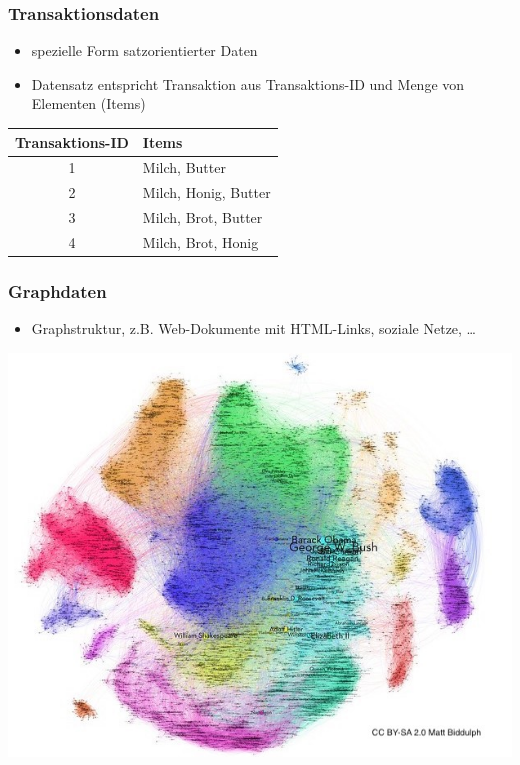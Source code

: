 \begin{frame}
\frametitle{Transaktionsdaten}

\begin{itemize}
\item spezielle Form satzorientierter Daten
\item Datensatz entspricht Transaktion aus Transaktions-ID und Menge von Elementen (Items)
\end{itemize}

\begin{center}
\begin{tabular}{|c|l|}
\hline
\rowcolor{Gray} Transaktions-ID & Items \\
\hline
\hline
1 & Milch, Butter \\
2 & Milch, Honig, Butter \\
3 & Milch, Brot, Butter \\
4 & Milch, Brot, Honig \\
\hline
\end{tabular}
\end{center}


\end{frame}


\begin{frame}
\frametitle{Graphdaten}

\begin{itemize}
\item Graphstruktur, z.B. Web-Dokumente mit HTML-Links, soziale Netze, \dots
\end{itemize}

\begin{center}
\includegraphics[scale=.35]{fig2/social-graph.jpg}
\end{center}
\end{frame}

